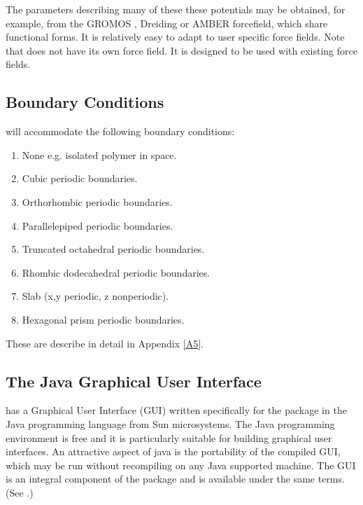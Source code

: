 The parameters describing many of these these potentials may be obtained, for
example, from the GROMOS
\cite{gunsteren-87a}, Dreiding
\cite{mayo-90a} or AMBER \cite{weiner-86a} forcefield, which share functional
forms.  It is relatively easy to adapt \D{} to user specific force
fields. Note that \D{} does not have its own
force field. It is designed to be used with existing force fields.

\subsection{Boundary Conditions}

\D{} will accommodate the following boundary conditions:

\begin{enumerate}
\item None e.g. isolated polymer in space.
\item Cubic periodic boundaries.
\item Orthorhombic periodic boundaries.
\item Parallelepiped periodic boundaries.
\item Truncated octahedral periodic boundaries.
\item Rhombic dodecahedral periodic boundaries.
\item Slab (x,y periodic, z nonperiodic).
\item Hexagonal prism periodic boundaries.
\end{enumerate}

These are describe in detail in Appendix \ref{A5}.

\subsection{The Java Graphical User Interface}

\D{} has a Graphical User Interface (GUI) written specifically for the package
in the Java programming language from Sun microsystems.  The Java programming
environment is free and it is particularly suitable for building graphical
user interfaces. An attractive aspect of java is the portability of the
compiled GUI, which may be run without recompiling on any Java supported
machine. The GUI is an integral component of the \D{} package and is available
under the same terms. (See \cite{smith-gui}.)

